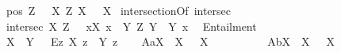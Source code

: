 \begin{isabellebody}
\ \ {\isachardoublequoteopen}pos\ Z\ {\isasymequiv}\ \ \isactrlbold {\isasymforall}X{\isachardot}\ Z\ X\ \isactrlbold {\isasymrightarrow}\ {\isasymP}\ X{\isachardoublequoteclose}\isanewline
{}\isamarkupfalse%
\ intersectionOf{\isacharcolon}{\isacharcolon}{\isachardoublequoteopen}{\isasymup}{\isasymlangle}{\isasymup}{\isasymlangle}{\isasymzero}{\isasymrangle}{\isacharcomma}{\isasymup}{\isasymlangle}{\isasymup}{\isasymlangle}{\isasymzero}{\isasymrangle}{\isasymrangle}{\isasymrangle}{\isachardoublequoteclose}\ {\isacharparenleft}{\isachardoublequoteopen}intersec{\isachardoublequoteclose}{\isacharparenright}\ \isanewline
\ \ {\isachardoublequoteopen}intersec\ X\ Z\ {\isasymequiv}\ \ \isactrlbold {\isasymbox}{\isacharparenleft}\isactrlbold {\isasymforall}x{\isachardot}{\isacharparenleft}X\ x\ \isactrlbold {\isasymleftrightarrow}\ {\isacharparenleft}\isactrlbold {\isasymforall}Y{\isachardot}\ {\isacharparenleft}Z\ Y{\isacharparenright}\ \isactrlbold {\isasymrightarrow}\ {\isacharparenleft}Y\ x{\isacharparenright}{\isacharparenright}{\isacharparenright}{\isacharparenright}{\isachardoublequoteclose}\ %
\isanewline
{}\isamarkupfalse%
\ Entailment{\isacharcolon}{\isacharcolon}{\isachardoublequoteopen}{\isasymup}{\isasymlangle}{\isasymup}{\isasymlangle}{\isasymzero}{\isasymrangle}{\isacharcomma}{\isasymup}{\isasymlangle}{\isasymzero}{\isasymrangle}{\isasymrangle}{\isachardoublequoteclose}\ {\isacharparenleft}\ {\isachardoublequoteopen}{\isasymRrightarrow}{\isachardoublequoteclose}\ {}{}{\isacharparenright}\ \isanewline
\ \ {\isachardoublequoteopen}X\ {\isasymRrightarrow}\ Y\ {\isasymequiv}\ \ \isactrlbold {\isasymbox}{\isacharparenleft}\isactrlbold {\isasymforall}\isactrlsup Ez{\isachardot}\ X\ z\ \isactrlbold {\isasymrightarrow}\ Y\ z{\isacharparenright}{\isachardoublequoteclose}%
\isamarkuptrue%
\isamarkupfalse%
\ \isanewline
\ \ A{}a{\isacharcolon}{\isachardoublequoteopen}{\isasymlfloor}\isactrlbold {\isasymforall}X{\isachardot}\ {\isasymP}\ {\isacharparenleft}\isactrlbold {\isasymrightharpoondown}X{\isacharparenright}\ \isactrlbold {\isasymrightarrow}\ \isactrlbold {\isasymnot}{\isacharparenleft}{\isasymP}\ X{\isacharparenright}\ {\isasymrfloor}{\isachardoublequoteclose}\ \ \ \ \ \ \ %
\isanewline
\ \ A{}b{\isacharcolon}{\isachardoublequoteopen}{\isasymlfloor}\isactrlbold {\isasymforall}X{\isachardot}\ \isactrlbold {\isasymnot}{\isacharparenleft}{\isasymP}\ X{\isacharparenright}\ \isactrlbold {\isasymrightarrow}\ {\isasymP}\ {\isacharparenleft}\isactrlbold {\isasymrightharpoondown}X{\isacharparenright}{\isasymrfloor}{\isachardoublequoteclose}\ \ \ \ \ \ \ \ %

\end{isabellebody}
